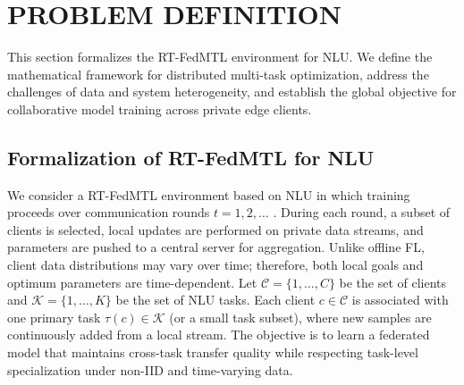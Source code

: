 
\section{PROBLEM DEFINITION}  
\label{sec:problem_definition}

This section formalizes the RT-FedMTL environment for NLU. We define the mathematical framework for distributed multi-task optimization, address the challenges of data and system heterogeneity, and establish the global objective for collaborative model training across private edge clients.

\subsection{Formalization of RT-FedMTL for NLU}
We consider a RT-FedMTL environment based on NLU in which training proceeds over communication rounds $t=1,2,\dots$ \cite{mcmahan2017fedavg,smith2017mocha,chen2024fedbone}. During each round, a subset of clients is selected, local updates are performed on private data streams, and parameters are pushed to a central server for aggregation. Unlike offline FL, client data distributions may vary over time; therefore, both local goals and optimum parameters are time-dependent. Let $\mathcal{C}=\{1,\dots,C\}$ be the set of clients and $\mathcal{K}=\{1,\dots,K\}$ be the set of NLU tasks. Each client $c\in\mathcal{C}$ is associated with one primary task $\tau(c)\in\mathcal{K}$ (or a small task subset), where new samples are continuously added from a local stream. The objective is to learn a federated model that maintains cross-task transfer quality while respecting task-level specialization under non-IID and time-varying data.

